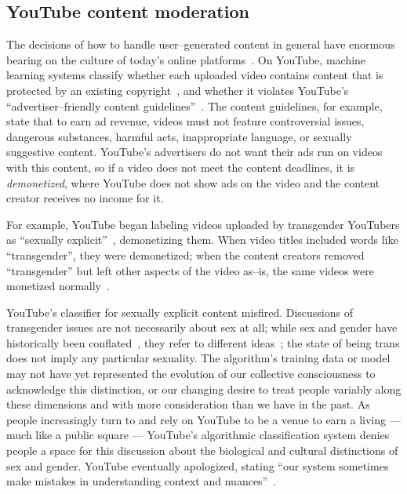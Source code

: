 \documentclass[street-level_algorithms]{subfiles}
\begin{document}
\subsection{YouTube content moderation}\label{sec:YouTube}

The decisions of how to handle user--generated content in general have enormous bearing on
the culture of today's online platforms~\cite{gillespie2018custodians}.
On YouTube, machine learning systems classify whether each uploaded video contains
content that is protected by an existing copyright~\cite{kim2007youtube},
and whether it violates YouTube's ``advertiser--friendly content guidelines''~\cite{youtube2010youtube}.
The content guidelines, for example, state that to earn ad revenue,
videos must not feature controversial issues, dangerous substances,
harmful acts, inappropriate language, or sexually suggestive content.
YouTube's advertisers do not want their ads run on videos with this content,
so if a video does not meet the content deadlines, it is \textit{demonetized},
where YouTube does not show ads on the video and the content creator receives no income for it.

For example, YouTube began labeling videos uploaded by transgender YouTubers
as ``sexually explicit''~\cite{LGBTYouTube}, demonetizing them.
When video titles included words like ``transgender'', they were demonetized;
when the content creators removed ``transgender'' but left other aspects of the video as--is,
the same videos were monetized normally~\cite{YouTubeProblems}.


YouTube's classifier for sexually explicit content misfired.
Discussions of transgender issues are not necessarily about sex at all;
while sex and gender have historically been conflated~\cite{valdes1994queers},
they refer to different ideas~\cite{udry1994nature};
the state of being trans does not imply any particular sexuality.
The algorithm's training data or model may not have yet represented
the evolution of our collective consciousness to acknowledge this distinction,
or our changing desire to treat people variably along these dimensions
and with more consideration than we have in the past.
As people increasingly turn to and rely on YouTube to be a venue to earn a living
--- much like a public square ---
YouTube's algorithmic classification system
denies people a space for this discussion about the biological and cultural distinctions of sex and gender.
YouTube eventually apologized, stating
``our system sometimes make mistakes in understanding context and nuances''~\cite{wright_2018}.
\end{document}
